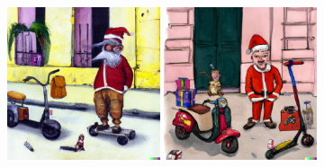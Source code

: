 \documentclass{article}
\newcommand{\imagewidthfactor}{0.4}
\begin{document}
\begin{figure}[h!]
\vspace{1.1em}
\includegraphics[width=\imagewidthfactor\textwidth]{media/7c.png}
\quad
\includegraphics[width=\imagewidthfactor\textwidth]{media/7d.png}
\end{figure}
\end{document}
